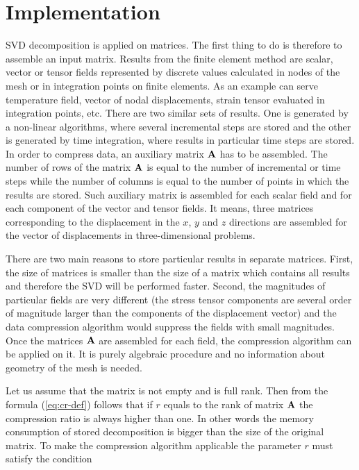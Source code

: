 \section{Implementation}
\label{sec:implementation}

SVD decomposition is applied on matrices. The first thing to do is therefore to assemble an input matrix. Results from the finite element method are scalar, vector or tensor fields represented by discrete values calculated in nodes of the mesh or in integration points on finite elements. As an example can serve temperature field, vector of nodal displacements, strain tensor evaluated in integration points, etc. There are two similar sets of results. One is generated by a non-linear algorithms, where several incremental steps are stored and the other is generated by time integration, where results in particular time steps are stored. In order to compress data, an auxiliary matrix $\mathbf{A}$ has to be assembled. The number of rows of the matrix $\mathbf{A}$ is equal to the number of incremental or time steps while the number of columns is equal to the number of points in which the results are stored. Such auxiliary matrix is assembled for each scalar field and for each component of the vector and tensor fields. It means, three matrices corresponding to the displacement in the $x$, $y$ and $z$ directions are assembled for the vector of displacements in three-dimensional problems.

There are two main reasons to store particular results in separate matrices. First, the size of matrices is smaller than the size of a matrix which contains all results and therefore the SVD will be performed faster. Second, the magnitudes of particular fields are very different (the stress tensor components are several order of magnitude larger than the components of the displacement vector) and the data compression algorithm would suppress the fields with small magnitudes. Once the matrices $\mathbf{A}$ are assembled for each field, the compression algorithm can be applied on it. It is purely algebraic procedure and no information about geometry of the mesh is needed.

Let us assume that the matrix is not empty and is full rank. Then from the formula (\ref{eq:cr-def}) follows that if $r$ equals to the rank of matrix $\mathbf{A}$ the compression ratio is always higher than one. In other words the memory consumption of stored decomposition is bigger than the size of the original matrix. To make the compression algorithm applicable the parameter $r$ must satisfy the condition

